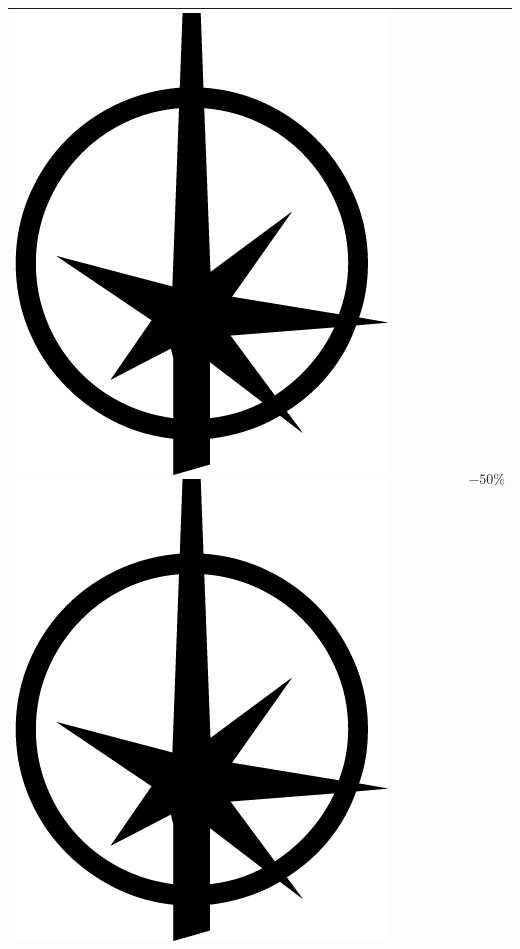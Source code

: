 \documentclass{article}
\begin{document}
\begin{center}
\begin{tabular}[b]{|p{5cm}|p{1cm}|}
		{\Large \includegraphics[height=\fontcharht\font`\B]{../img/result_triomphe_triumph} \includegraphics[height=\fontcharht\font`\B]{../img/result_triomphe_triumph}} & $-50\%$ \\ 
		\hline 

\end{tabular}
\end{center}
\end{document}
